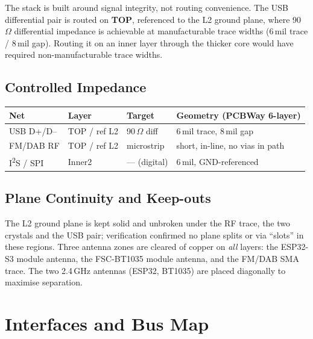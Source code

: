 \documentclass[11pt,a4paper]{report}
\begin{document}
\begin{designbox}
The stack is built around signal integrity, not routing convenience. The USB
differential pair is routed on \textbf{TOP}, referenced to the L2 ground plane, where
90\,$\Omega$ differential impedance is achievable at manufacturable trace widths
(6\,mil trace / 8\,mil gap). Routing it on an inner layer through the thicker
core would have required non-manufacturable trace widths.
\end{designbox}

\section{Controlled Impedance}
\begin{center}\begin{tabularx}{\textwidth}{@{}l l l X@{}}
\toprule
\textbf{Net} & \textbf{Layer} & \textbf{Target} & \textbf{Geometry (PCBWay 6-layer)}\\
\midrule
USB D+/D-- & TOP / ref L2 & 90\,$\Omega$ diff & 6\,mil trace, 8\,mil gap \\
FM/DAB RF  & TOP / ref L2 & microstrip     & short, in-line, no vias in path \\
I\textsuperscript{2}S / SPI & Inner2 & --- (digital) & 6\,mil, GND-referenced \\
\bottomrule
\end{tabularx}\end{center}

\section{Plane Continuity and Keep-outs}
The L2 ground plane is kept solid and unbroken under the RF trace, the two crystals
and the USB pair; verification confirmed no plane splits or via ``slots'' in these
regions. Three antenna zones are cleared of copper on \emph{all} layers: the ESP32-S3
module antenna, the FSC-BT1035 module antenna, and the FM/DAB SMA trace. The two
2.4\,GHz antennas (ESP32, BT1035) are placed diagonally to maximise separation.

\chapter{Interfaces and Bus Map}
\end{document}
